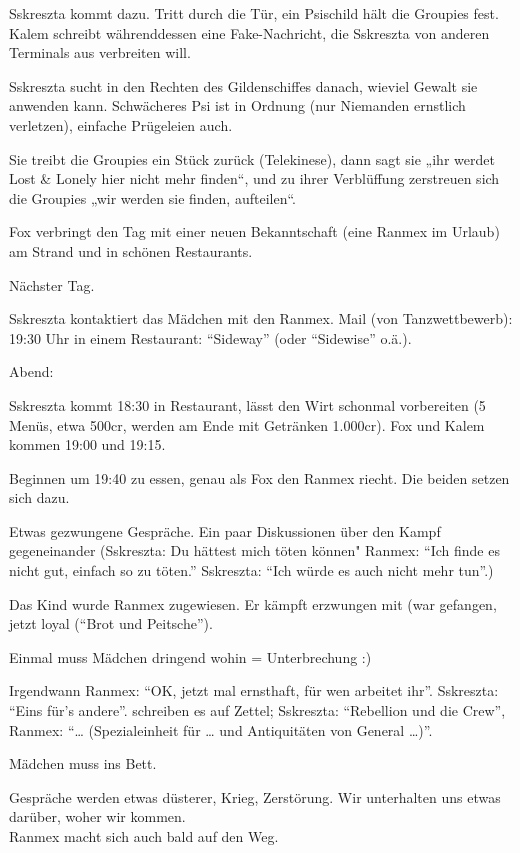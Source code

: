 \documentclass[11pt]{article}
\begin{document}
Sskreszta kommt dazu. Tritt durch die Tür, ein Psischild hält die
Groupies fest. Kalem schreibt währenddessen eine Fake-Nachricht, die
Sskreszta von anderen Terminals aus verbreiten will.

Sskreszta sucht in den Rechten des Gildenschiffes danach, wieviel Gewalt
sie anwenden kann. Schwächeres Psi ist in Ordnung (nur Niemanden
ernstlich verletzen), einfache Prügeleien auch.

Sie treibt die Groupies ein Stück zurück (Telekinese), dann sagt sie
„ihr werdet Lost \& Lonely hier nicht mehr finden``, und zu ihrer
Verblüffung zerstreuen sich die Groupies „wir werden sie finden,
aufteilen``.

Fox verbringt den Tag mit einer neuen Bekanntschaft (eine Ranmex im
Urlaub) am Strand und in schönen Restaurants.

Nächster Tag.

Sskreszta kontaktiert das Mädchen mit den Ranmex. Mail (von
Tanzwettbewerb): 19:30 Uhr in einem Restaurant: ``Sideway'' (oder
``Sidewise'' o.ä.).

Abend:

Sskreszta kommt 18:30 in Restaurant, lässt den Wirt schonmal vorbereiten
(5 Menüs, etwa 500cr, werden am Ende mit Getränken 1.000cr). Fox und
Kalem kommen 19:00 und 19:15.

Beginnen um 19:40 zu essen, genau als Fox den Ranmex riecht. Die beiden
setzen sich dazu.

Etwas gezwungene Gespräche. Ein paar Diskussionen über den Kampf
gegeneinander (Sskreszta: Du hättest mich töten können" Ranmex: ``Ich
finde es nicht gut, einfach so zu töten.'' Sskreszta: ``Ich würde es
auch nicht mehr tun''.)

Das Kind wurde Ranmex zugewiesen. Er kämpft erzwungen mit (war gefangen,
jetzt loyal (``Brot und Peitsche'').

Einmal muss Mädchen dringend wohin = Unterbrechung :)

Irgendwann Ranmex: ``OK, jetzt mal ernsthaft, für wen arbeitet ihr''.
Sskreszta: ``Eins für's andere''. schreiben es auf Zettel; Sskreszta:
``Rebellion und die Crew'', Ranmex: ``\ldots{} (Spezialeinheit für
\ldots{} und Antiquitäten von General \ldots{})''.

Mädchen muss ins Bett.

Gespräche werden etwas düsterer, Krieg, Zerstörung. Wir unterhalten uns
etwas darüber, woher wir kommen.\\ Ranmex macht sich auch bald auf den
Weg.
\end{document}
